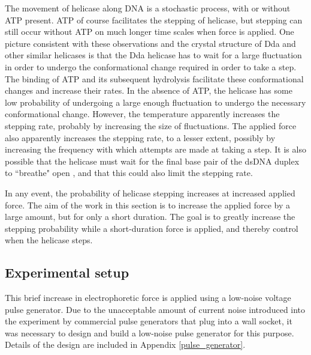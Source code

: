 The movement of helicase along DNA is a stochastic process, with or without ATP present.  ATP of course facilitates the stepping of helicase, but stepping can still occur without ATP on much longer time scales when force is applied.  One picture consistent with these observations and the crystal structure of Dda and other similar helicases is that the Dda helicase has to wait for a large fluctuation in order to undergo the conformational change required in order to take a step.  The binding of ATP and its subsequent hydrolysis facilitate these conformational changes and increase their rates.  In the absence of ATP, the helicase has some low probability of undergoing a large enough fluctuation to undergo the necessary conformational change.  However, the temperature apparently increases the stepping rate, probably by increasing the size of fluctuations.  The applied force also apparently increases the stepping rate, to a lesser extent, possibly by increasing the frequency with which attempts are made at taking a step.  It is also possible that the helicase must wait for the final base pair of the dsDNA duplex to ``breathe" open \citep{Jose2009}, and that this could also limit the stepping rate.

In any event, the probability of helicase stepping increases at increased applied force.  The aim of the work in this section is to increase the applied force by a large amount, but for only a short duration.  The goal is to greatly increase the stepping probability while a short-duration force is applied, and thereby control when the helicase steps.

\subsection{Experimental setup}

This brief increase in electrophoretic force is applied using a low-noise voltage pulse generator.  Due to the unacceptable amount of current noise introduced into the experiment by commercial pulse generators that plug into a wall socket, it was necessary to design and build a low-noise pulse generator for this purpose.  Details of the design are included in Appendix \ref{pulse_generator}.


